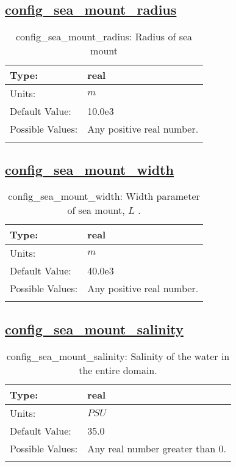 \subsection[config\_sea\_mount\_radius]{\hyperref[sec:nm_tab_sea_mount]{config\_sea\_mount\_radius}}
\label{subsec:nm_sec_config_sea_mount_radius}
\begin{center}
\begin{longtable}{| p{2.0in} || p{4.0in} |}
    \hline
    Type: & real \\
    \hline
    Units: & $m$ \\
    \hline
    Default Value: & 10.0e3 \\
    \hline
    Possible Values: & Any positive real number. \\
    \hline
    \caption{config\_sea\_mount\_radius: Radius of sea mount}
\end{longtable}
\end{center}
\subsection[config\_sea\_mount\_width]{\hyperref[sec:nm_tab_sea_mount]{config\_sea\_mount\_width}}
\label{subsec:nm_sec_config_sea_mount_width}
\begin{center}
\begin{longtable}{| p{2.0in} || p{4.0in} |}
    \hline
    Type: & real \\
    \hline
    Units: & $m$ \\
    \hline
    Default Value: & 40.0e3 \\
    \hline
    Possible Values: & Any positive real number. \\
    \hline
    \caption{config\_sea\_mount\_width:  Width parameter of sea mount,  $L$ .}
\end{longtable}
\end{center}
\subsection[config\_sea\_mount\_salinity]{\hyperref[sec:nm_tab_sea_mount]{config\_sea\_mount\_salinity}}
\label{subsec:nm_sec_config_sea_mount_salinity}
\begin{center}
\begin{longtable}{| p{2.0in} || p{4.0in} |}
    \hline
    Type: & real \\
    \hline
    Units: & $PSU$ \\
    \hline
    Default Value: & 35.0 \\
    \hline
    Possible Values: & Any real number greater than 0. \\
    \hline
    \caption{config\_sea\_mount\_salinity: Salinity of the water in the entire domain.}
\end{longtable}
\end{center}
